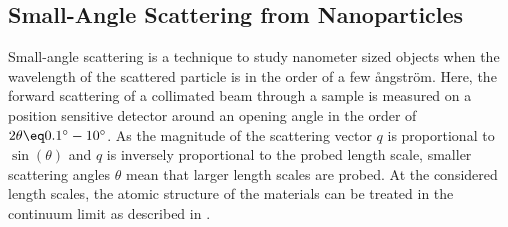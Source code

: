 \documentclass[\main/dresen_thesis.tex]{subfiles}
\begin{document}
  \subsection{Small-Angle Scattering from Nanoparticles}\label{sec:theoreticalBackground:scattering:SASNanoparticles}
    Small-angle scattering is a technique to study nanometer sized objects when the wavelength of the scattered particle is in the order of a few {\aa}ngstr\"om.
    Here, the forward scattering of a collimated beam through a sample is measured on a position sensitive detector around an opening angle in the order of $2 \theta \eq 0.1^\circ - 10^\circ$.
    As the magnitude of the scattering vector $q$ is proportional to $\sin(\theta)$ and $q$ is inversely proportional to the probed length scale, smaller scattering angles $\theta$ mean that larger length scales are probed.
    At the considered length scales, the atomic structure of the materials can be treated in the continuum limit as described in .
\end{document}
